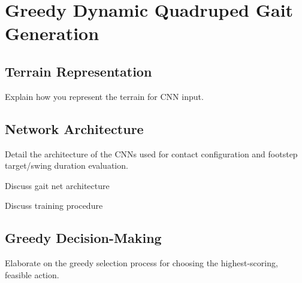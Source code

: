\section{Greedy Dynamic Quadruped Gait Generation}

\subsection{Terrain Representation}

\begin{outline}
  Explain how you represent the terrain for CNN input.
\end{outline}

\subsection{Network Architecture}

\begin{outline}
  Detail the architecture of the CNNs used for contact configuration
  and footstep target/swing duration evaluation.
\end{outline}

\begin{todo}
  Discuss gait net architecture
\end{todo}

\begin{todo}
  Discuss training procedure
\end{todo}

\subsection{Greedy Decision-Making}

\begin{outline}
  Elaborate on the greedy selection process for choosing the
  highest-scoring, feasible action.
\end{outline}
